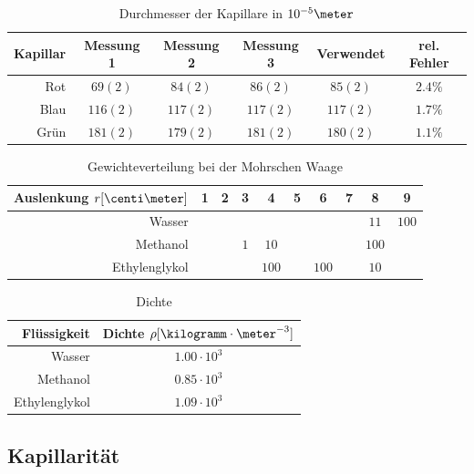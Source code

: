 \documentclass[12pt, a4paper, twoside]{scrartcl}
\begin{document}
\begin{table}[!h]
\centering
\begin{tabular}{r|c|c|c||c|c}
    Kapillar & Messung 1 & Messung 2 & Messung 3 & Verwendet & rel. Fehler\\
    \hline
    Rot & $69(2)$ & $84(2)$ & $86(2)$ & $85(2)$ & $ 2.4\%$\\
    Blau & $116(2)$ & $117(2)$ & $117(2)$ & $117(2)$ & $ 1.7\%$\\
    Grün & $181(2)$ & $179(2)$ & $181(2)$ & $180(2)$ & $ 1.1\%$\\
    
 \end{tabular} 
 \caption{\label{tab:d_kap} Durchmesser der Kapillare in $ 10^{-5} \meter$}
\end{table}

\begin{table}[!h]
\centering
\begin{tabular}{r|c|c|c|c|c|c|c|c|c}
    Auslenkung $r[\centi\meter]$ & 1 & 2 & 3 & 4 & 5 & 6 & 7 & 8 & 9\\
    \hline
    \hline
    Wasser & & & & & & & & $11$ & $100$ \\
    \hline
    Methanol & & & $1$ & $10$ & & & & $100$ & \\
    \hline
    Ethylenglykol & & & & $100$ & & $100$ & & $10$ & \\
    
 \end{tabular} 
 \caption{\label{tab:mohrsche_waage}Gewichteverteilung bei der Mohrschen Waage}
\end{table}

\begin{table}[!h]
\centering
\begin{tabular}{r|c}
    Flüssigkeit & Dichte $\rho [\kilogramm\cdot\meter^{-3}]$\\
    \hline
    Wasser & $1.00\cdot 10^{3}$\\
    \hline
    Methanol & $ 0.85\cdot 10^{3}$\\
    \hline
    Ethylenglykol & $ 1.09 \cdot 10^{3}$\\
    
 \end{tabular} 
 \caption{\label{tab:dichte}Dichte}
\end{table}

\subsection{Kapillarität}
\end{document}

